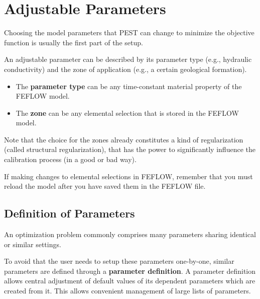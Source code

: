 \section{Adjustable Parameters}

Choosing the model parameters that PEST can change to minimize the objective function is usually the first part of the setup.

An adjustable parameter can be described by its parameter type (e.g., hydraulic conductivity) and the zone of application (e.g., a certain geological formation).

\begin{itemize}
\item The \textbf{parameter type} can be any time-constant material property of the FEFLOW model. \marginpar{!}
\item The \textbf{zone} can be any elemental selection that is stored in the FEFLOW model.
\end{itemize}

Note that the choice for the zones already constitutes a kind of regularization (called structural regularization), that has the power to significantly influence the calibration process (in a good or bad way).

If making changes to elemental selections in FEFLOW, remember that you must reload the model after you have saved them in the FEFLOW file.
	

 	
\subsection{Definition of Parameters}

An optimization problem commonly comprises many parameters sharing identical or similar settings.

To avoid that the user needs to setup these parameters one-by-one, similar parameters are defined through a \textbf{parameter definition}. A parameter definition allows central adjustment of default values of its dependent parameters which are created from it. This allows convenient management of large lists of parameters.

